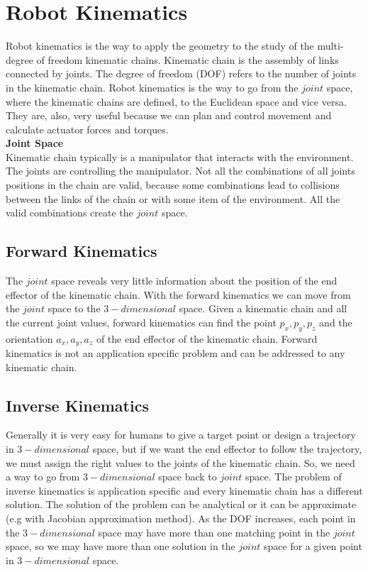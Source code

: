 \section{Robot Kinematics}
Robot kinematics is the way to apply the geometry to the study of the multi-degree of freedom kinematic chains. Kinematic chain is the assembly of links connected by joints. The degree of freedom (DOF) refers to the number of joints in the kinematic chain. Robot kinematics is the way to go from the \(joint\) space, where the kinematic chains are defined, to the Euclidean space and vice versa. They are, also, very useful because we can plan and control movement and calculate actuator forces and torques.\\
\textbf{Joint Space}\\
Kinematic chain typically is a manipulator that interacts with the environment. The joints are controlling the manipulator. Not all the combinations of all joints positions in the chain are valid, because some combinations lead to collisions between the links of the chain or with some item of the environment. All the valid combinations create the \(joint\) space.
\subsection{Forward Kinematics}
The \(joint\) space reveals very little information about the position of the end effector of the kinematic chain. With the forward kinematics we can move from the \(joint\) space to the \(3-dimensional\) space. Given a kinematic chain and all the current joint values, forward kinematics can find the point \(p_x,p_y,p_z\) and the orientation \(a_x,a_y,a_z\) of the end effector of the kinematic chain. Forward kinematics is not an application specific problem and can be addressed to any kinematic chain.
\subsection{Inverse Kinematics}
Generally it is very easy for humans to give a target point or design a trajectory in \(3-dimensional\) space, but if we want the end effector to follow the trajectory, we must assign the right values to the joints of the kinematic chain. So, we need a way to go from \(3-dimensional\) space back to \(joint\) space. The problem of inverse kinematics is application specific and every kinematic chain has a different solution. The solution of the problem can be analytical or it can be approximate (e.g with Jacobian approximation method). As the DOF increases, each point in the \(3-dimensional\) space may have more than one matching point in the \(joint\) space, so we may have more than one solution in the \(joint\) space for a given point in \(3-dimensional\) space.\\

